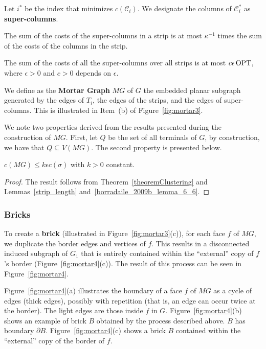 Let \(i^\ast\) be the index that minimizes \(c(\mathcal{C}_i)\). We designate the columns of \(\mathcal{C}_i^\ast\) as \textbf{super-columns}.

\begin{flemma}
The sum of the costs of the super-columns in a strip is at most \(\kappa^{-1}\) times the sum of the costs of the columns in the strip.
\end{flemma}

\begin{flemma} \label{borradaile_2009b_lemma_6_6}
     The sum of the costs of all the super-columns over all strips is at most \(c \epsilon \operatorname{\textrm{OPT}}\), where \(\epsilon > 0\) and \(c > 0\) depends on \(\epsilon\).
\end{flemma}

We define as the \textbf{Mortar Graph} \(MG\) of \(G\) the embedded planar subgraph generated by the edges of \(T_i\), the edges of the strips, and the edges of super-columns. This is illustrated in Item~(b) of Figure~\ref{fig:mortar3}.

We note two properties derived from the results presented during the construction of \(MG\). First, let \(Q\) be the set of all terminals of \(G\), by construction, we have that \(Q \subseteq V(MG)\). The second property is presented below.

\begin{flemma} \label{length_mg}
     \(c(MG) \leq k \epsilon c(\sigma)\) with \(k > 0\) constant.
\end{flemma}
\begin{proof}
    The result follows from Theorem~\ref{theoremClustering} and Lemmas~\ref{strip_length} and~\ref{borradaile_2009b_lemma_6_6}.
\end{proof}

\subsubsection{Bricks}

To create a \textbf{brick} (illustrated in  Figure~\ref{fig:mortar3}(c)), for each face \(f\) of \(MG\), we duplicate the border edges and vertices of \(f\). This results in a disconnected induced subgraph of \(G_1\) that is entirely contained within the ``external'' copy of \(f\)'s border (Figure~\ref{fig:mortar4}(c)). The result of this process can be seen in Figure~\ref{fig:mortar4}.

Figure~\ref{fig:mortar4}(a) illustrates the boundary of a face \(f\) of \(MG\) as a cycle of edges (thick edges), possibly with repetition (that is, an edge can occur twice at the border). The light edges are those inside \(f\) in \(G\). Figure~\ref{fig:mortar4}(b) shows an example of brick \(B\) obtained by the process described above. \(B\) has boundary \(\partial B\). Figure~\ref{fig:mortar4}(c) shows a brick \(B\) contained within the ``external'' copy of the border of \(f\).

